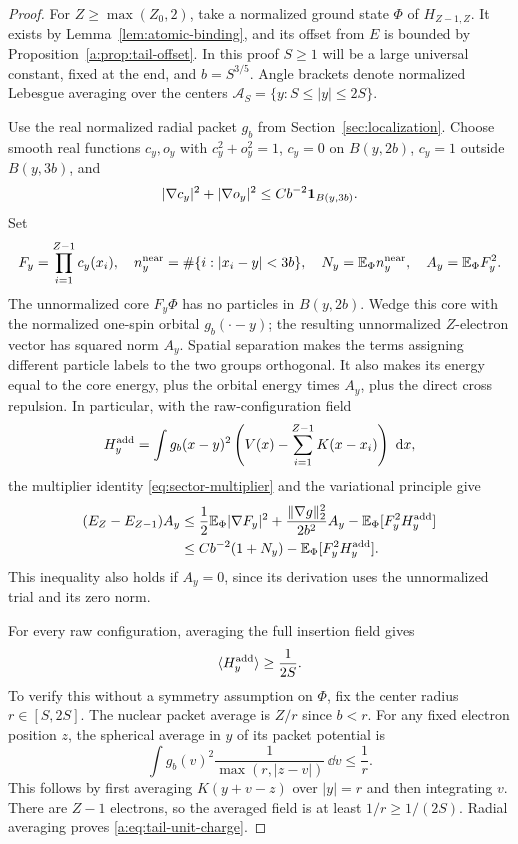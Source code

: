 \begin{proof}
For $Z\ge\max(Z_0,2)$, take a normalized ground state $\Phi$ of
$H_{Z-1,Z}$.  It exists by Lemma~\ref{lem:atomic-binding}, and its offset
from $E$ is bounded by Proposition~\ref{a:prop:tail-offset}.  In this proof
$S\ge1$ will be a large universal constant, fixed at the end, and
$b=S^{3/5}$.  Angle brackets denote normalized Lebesgue averaging over
the centers $\mathcal A_S=\{y:S\le|y|\le2S\}$.

Use the real normalized radial packet $g_b$ from
Section~\ref{sec:localization}.  Choose smooth real functions
$c_y,o_y$ with $c_y^2+o_y^2=1$, $c_y=0$ on $B(y,2b)$, $c_y=1$
outside $B(y,3b)$, and
\[
 |\nabla c_y|^2+|\nabla o_y|^2
 \le Cb^{-2}\mathbf 1_{B(y,3b)}.
\]
Set
\[
 F_y=\prod_{i=1}^{Z-1}c_y(x_i),\quad
 n_y^{\rm near}=\#\{i:|x_i-y|<3b\},\quad
 N_y=\mathbb E_\Phi n_y^{\rm near},\quad
 A_y=\mathbb E_\Phi F_y^2.
\]
The unnormalized core $F_y\Phi$ has no particles in $B(y,2b)$.
Wedge this core with the normalized one-spin orbital $g_b(\cdot-y)$;
the resulting unnormalized $Z$-electron vector has squared norm $A_y$.
Spatial separation makes the
terms assigning different particle labels to the two groups orthogonal.
It also makes its energy equal to the core energy, plus the orbital
energy times $A_y$, plus the direct cross repulsion.  In particular,
with the raw-configuration field
\[
 H_y^{\rm add}
 =\int g_b(x-y)^2
       \left(V(x)-\sum_{i=1}^{Z-1}K(x-x_i)\right)\,\,\mathrm d x,
\]
the multiplier identity \eqref{eq:sector-multiplier} and the variational
principle give
\begin{align}
 (E_Z-E_{Z-1})A_y
 &\le \frac12\mathbb E_\Phi|\nabla F_y|^2
       +\frac{\|\nabla g\|_2^2}{2b^2}A_y
       -\mathbb E_\Phi[F_y^2H_y^{\rm add}]\notag\\
 &\le Cb^{-2}(1+N_y)-\mathbb E_\Phi[F_y^2H_y^{\rm add}].
 \label{a:eq:tail-insertion}
\end{align}
This inequality also holds if $A_y=0$, since its derivation uses the
unnormalized trial and its zero norm.

For every raw configuration, averaging the full insertion field gives
\begin{equation}\label{a:eq:tail-unit-charge}
 \langle H_y^{\rm add}\rangle\ge\frac1{2S}.
\end{equation}
To verify this without a symmetry assumption on $\Phi$, fix the center
radius $r\in[S,2S]$.  The nuclear packet average is $Z/r$ since $b<r$.
For any fixed electron position $z$, the spherical average in $y$ of its
packet potential is
\[
 \int g_b(v)^2\frac1{\max(r,|z-v|)}\,\dd v\le\frac1r.
\]
This follows by first averaging $K(y+v-z)$ over $|y|=r$ and then
integrating $v$.  There are $Z-1$ electrons, so the averaged field is at
least $1/r\ge1/(2S)$.  Radial averaging proves
\eqref{a:eq:tail-unit-charge}.


\end{proof}
